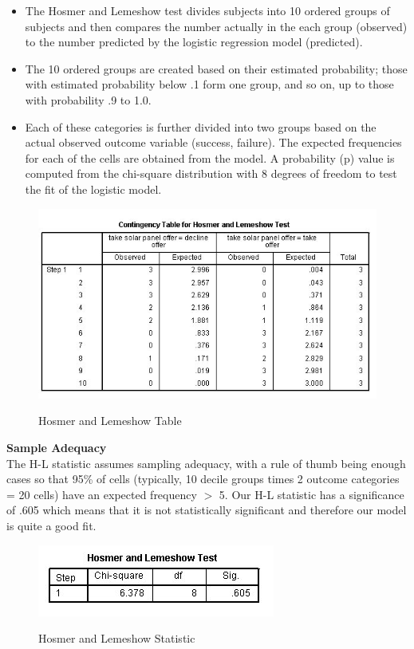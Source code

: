 \documentclass[a4paper,12pt]{article}
\begin{document}
\begin{itemize}
	\item The Hosmer and Lemeshow test
	divides subjects into 10 ordered groups of subjects and then compares the number
	actually in the each group (observed) to the number predicted by the logistic regression
	model (predicted). 
	\item The 10 ordered groups are created based on their estimated probability; those with estimated probability below .1 form one group, and so on, up to those with probability .9 to 1.0.
	\item 
	Each of these categories is further divided into two groups based on the actual observed outcome variable (success, failure). The expected frequencies for each of the cells are obtained from the model. A probability (p) value is
	computed from the chi-square distribution with 8 degrees of freedom to test the fit of the logistic model.
	
\end{itemize}
\begin{figure}[h!]
	\begin{center}
		\includegraphics[scale=0.6]{images/Logistic6}\\
		\caption{Hosmer and Lemeshow Table}
	\end{center}
\end{figure}

\noindent \textbf{Sample Adequacy}\\


The H-L statistic assumes sampling adequacy, with a rule of thumb being enough cases so that 95\% of cells (typically, 10 decile groups times 2 outcome categories = 20 cells) have an expected frequency $>$ 5. Our H-L statistic has a significance of .605 which means that it is not statistically significant and therefore our model is quite a
good fit.
\begin{figure}[h!]
	\begin{center}
		\includegraphics[scale=0.6]{images/Logistic7A}\\
		\caption{Hosmer and Lemeshow Statistic}
	\end{center}
\end{figure}
\end{document}
